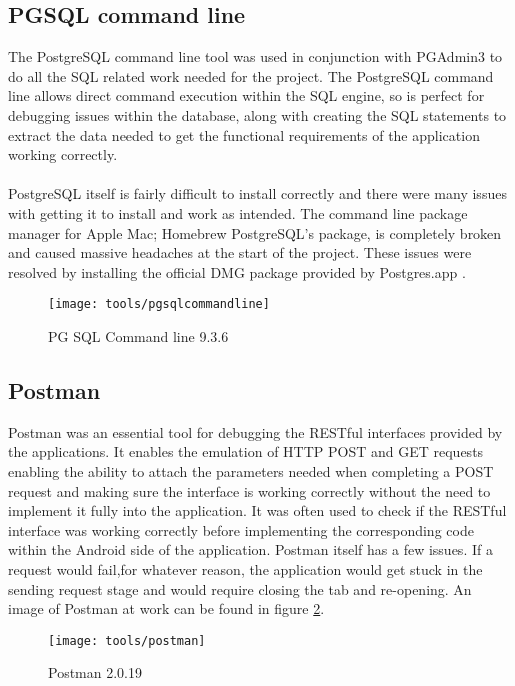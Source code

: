 \subsection{PGSQL command line}

The PostgreSQL command line tool was used in conjunction with PGAdmin3 to do all the SQL related work needed for the project. The PostgreSQL command line allows direct command execution within the SQL engine, so is perfect for debugging issues within the database, along with creating the SQL statements to extract the data needed to get the functional requirements of the application working correctly.\\
\\
PostgreSQL itself is fairly difficult to install correctly and there were many issues with getting it to install and work as intended. The command line package manager for Apple Mac; Homebrew PostgreSQL's package, is completely broken and caused massive headaches at the start of the project. These issues were resolved by installing the official DMG package provided by Postgres.app \cite{jemt:postgresapp:2015:online}.

\begin{figure}[H]
    \centering
    \texttt{[image: tools/pgsqlcommandline]}
    \caption{PG SQL Command line 9.3.6}
    \label{fig:pg_sql_image}
\end{figure} 

\subsection{Postman}

Postman was an essential tool for debugging the RESTful interfaces provided by the applications. It enables the emulation of HTTP POST and GET requests enabling the ability to attach the parameters needed when completing a POST request and making sure the interface is working correctly without the need to implement it fully into the application. It was often used to check if the RESTful interface was working correctly before implementing the corresponding code within the Android side of the application. Postman itself has a few issues. If a request would fail,for whatever reason, the application would get stuck in the sending request stage and would require closing the tab and re-opening. An image of Postman at work can be found in figure \ref{fig:postman_image}.

\begin{figure}[H]
    \centering
    \texttt{[image: tools/postman]}
    \caption{Postman 2.0.19}
    \label{fig:postman_image}
\end{figure} 

